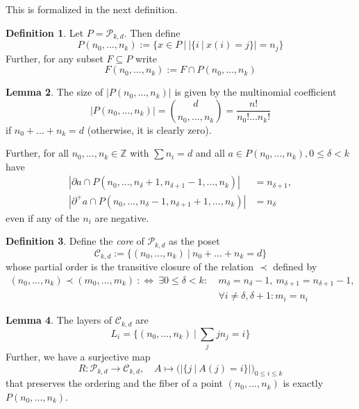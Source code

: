 \documentclass{scrartcl}
\newcommand{\Z}{\mathbb{Z}}
\theoremstyle{definition}
\newtheorem{definition}{Definition}
\newtheorem{lemma}[definition]{Lemma}
\begin{document}
This is formalized in the next definition.
\begin{definition}
    Let $P = \mathcal{P}_{k, d}$. Then define
    \begin{equation*}
        P(n_0, ..., n_k) := \{ x \in P \ | \ |\{i \ | \ x(i) = j\}| = n_j \}
    \end{equation*}
    Further, for any subset $F \subseteq P$ write
    \begin{equation*}
        F(n_0, ..., n_k) := F \cap P(n_0, ..., n_k)
    \end{equation*}
\end{definition}
\begin{lemma}
    \label{prop:properties_n_distribution_subsets}
    The size of $|P(n_0, ..., n_k)|$ is given by the multinomial coefficient
    \begin{equation*}
        |P(n_0, ..., n_k)| = { d \choose n_0, ..., n_k } =  \frac {n!} {n_0! ... n_k!}
    \end{equation*}
    if $n_0 + ... + n_k = d$ (otherwise, it is clearly zero).

    Further, for all $n_0, ..., n_k \in \Z$ with $\sum n_i = d$ and all $a \in P(n_0, ..., n_k), 0 \leq \delta < k$ have
    \begin{align*}
        |\partial a \cap P(n_0, ..., n_\delta + 1, n_{\delta + 1} - 1, ..., n_k)| &= n_{\delta + 1}, \\
        |\partial^+ a \cap P(n_0, ..., n_\delta - 1, n_{\delta + 1} + 1, ..., n_k)| &= n_\delta
    \end{align*}
    even if any of the $n_i$ are negative.
\end{lemma}
\begin{definition}
    Define the \emph{core} of $\mathcal{P}_{k, d}$ as the poset
    \begin{equation*}
        \mathcal{C}_{k, d} := \{ (n_0, ..., n_k) \ | \ n_0 + ... + n_k = d \}
    \end{equation*}
    whose partial order is the transitive closure of the relation $\prec$ defined by
    \begin{align*}
        (n_0, ..., n_k) \prec (m_0, ..., m_k) \ :\Leftrightarrow \ \exists 0 \leq \delta < k: \ &m_\delta = n_\delta - 1, \ m_{\delta + 1} = n_{\delta + 1} - 1, \\
        &\forall i \neq \delta, \delta + 1: m_i = n_i 
    \end{align*}
\end{definition}
\begin{lemma}
    The layers of $\mathcal{C}_{k, d}$ are
    \begin{equation*}
        L_i = \{ (n_0, ..., n_k) \ | \ \sum_j j n_j = i \}
    \end{equation*}
    Further, we have a surjective map
    \begin{equation*}
        R: \mathcal{P}_{k, d} \to \mathcal{C}_{k, d}, \quad A \mapsto \bigl( |\{j \ | \ A(j) = i\}| \bigr)_{0 \leq i \leq k}
    \end{equation*}
    that preserves the ordering and the fiber of a point $(n_0, ..., n_k)$ is exactly $P(n_0, ..., n_k)$.
\end{lemma}
\end{document}
